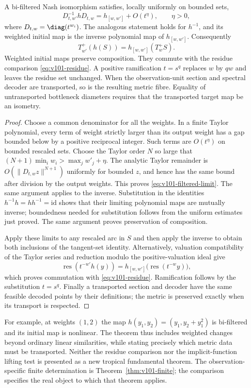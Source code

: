 \begin{theorem}\label{thm:v101-filtered}
A bi-filtered Nash isomorphism satisfies, locally uniformly on bounded
sets,
\begin{equation}\label{eq:v101-filtered-limit}
 D_{t,w'}^{-1}hD_{t,w}=h_{[w,w']}+O(t^\eta),\qquad \eta>0,
\end{equation}
where $D_{t,w}=\diag(t^{w_i})$. The analogous statement holds for
$h^{-1}$, and its weighted initial map is the inverse polynomial map
of $h_{[w,w']}$. Consequently
\[
 T_{w'}^+(h(S))=h_{[w,w']}(T_w^+S).
\]
Weighted initial maps preserve composition. They commute with the
residue comparison \eqref{eq:v101-residue}. A positive ramification
$t=s^q$ replaces $w$ by $qw$ and leaves the residue set unchanged.
When the observation-unit section and spectral decoder are transported,
so is the resulting metric fibre. Equality of untransported bottleneck
diameters requires that the transported target map be an isometry.
\end{theorem}
\begin{proof}
Choose a common denominator for all the weights. In a finite Taylor
polynomial, every term of weight strictly larger than its output weight
has a gap bounded below by a positive reciprocal integer. Such terms
are $O(t^\eta)$ on bounded rescaled sets. Choose the Taylor order $N$
so large that $(N+1)\min_i w_i>\max_j w'_j+\eta$.
The analytic Taylor remainder is $O(\|D_{t,w}z\|^{N+1})$ uniformly
for bounded $z$, and hence has the same bound after division by the
output weights. This proves \eqref{eq:v101-filtered-limit}. The same
argument applies to the inverse. Substitution in the identities
$h^{-1}h=hh^{-1}=\mathrm{id}$ shows that their limiting polynomial
maps are mutually inverse; boundedness needed for substitution follows
from the uniform estimates just proved. The same argument proves
preservation of composition.

Apply these limits to any rescaled arc in $S$ and then apply the inverse
to obtain both inclusions of the tangent-set identity. Alternatively,
valuation compatibility of the Taylor series and reduction modulo the
positive-valuation ideal give
\[
 \operatorname{res}(t^{-w'}h(y))=
 h_{[w,w']}\bigl(\operatorname{res}(t^{-w}y)\bigr),
\]
which proves commutation with \eqref{eq:v101-residue}. Ramification
follows by the substitution $t=s^q$. Finally a transported section and
decoder have the same feasible decoded points by their definitions;
the metric is preserved exactly when its transport is respected.
\end{proof}

For example, at weights $(1,2)$ the map
$h(y_1,y_2)=(y_1,y_2+y_1^2)$ is bi-filtered and its initial map is
nonlinear. The theorem thus includes weighted changes beyond ordinary
linear similarities, while stating precisely which metric data must be
transported. Neither the residue comparison nor the implicit-function
lifting test is presented as a new tropical fundamental theorem. The
observation-specific finite determination is
Theorem~\ref{thm:v101-finite}; the comparison specifies the real
object to which that theorem applies.
